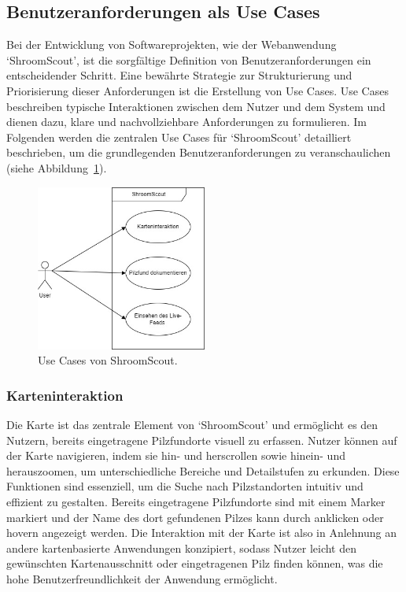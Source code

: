 \documentclass[../main.tex]{subfiles} %
\begin{document}
\subsection{Benutzeranforderungen als Use Cases} %

Bei der Entwicklung von Softwareprojekten, wie der Webanwendung `ShroomScout', ist die sorgfältige Definition von
Benutzeranforderungen ein entscheidender Schritt. Eine bewährte Strategie zur Strukturierung und Priorisierung dieser
Anforderungen ist die Erstellung von Use Cases. Use Cases beschreiben typische Interaktionen zwischen dem Nutzer und
dem System und dienen dazu, klare und nachvollziehbare Anforderungen zu formulieren. Im Folgenden werden die zentralen
Use Cases für `ShroomScout' detailliert beschrieben, um die grundlegenden Benutzeranforderungen zu veranschaulichen
(siehe Abbildung~\ref{fig:UseCase_Diagramm}).

\begin{figure}[ht]
	\centering
	\includegraphics[width=0.5\textwidth]{abbildungen/UseCaseDiagrammDrawio.jpg}
	\caption{Use Cases von ShroomScout.}
	\label{fig:UseCase_Diagramm}
\end{figure}

\subsubsection{Karteninteraktion}

Die Karte ist das zentrale Element von `ShroomScout' und ermöglicht es den Nutzern, bereits eingetragene Pilzfundorte
visuell zu erfassen. Nutzer können auf der Karte navigieren, indem sie hin- und herscrollen sowie hinein- und herauszoomen,
um unterschiedliche Bereiche und Detailstufen zu erkunden. Diese Funktionen sind essenziell, um die Suche nach Pilzstandorten
intuitiv und effizient zu gestalten. Bereits eingetragene Pilzfundorte sind mit einem Marker markiert und der Name des dort
gefundenen Pilzes kann durch anklicken oder hovern angezeigt werden. Die Interaktion mit der Karte ist also in Anlehnung an
andere kartenbasierte Anwendungen konzipiert, sodass Nutzer leicht den gewünschten Kartenausschnitt oder eingetragenen Pilz
finden können, was die hohe Benutzerfreundlichkeit der Anwendung ermöglicht.
\end{document}
